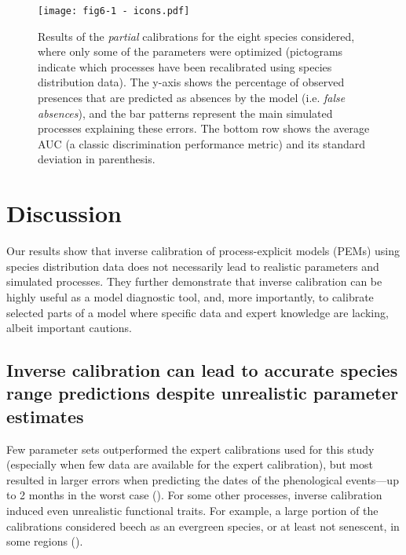 \documentclass[letterpaper,8pt]{extarticle}  %
\begin{document}
\begin{doublespacing}
\begin{linenumbers}
\begin{figure}[htpb]
\hspace*{-0.5cm}
\centering
\texttt{[image: fig6-1 - icons.pdf]}
\caption{Results of the \emph{partial} calibrations for the eight species considered, where only some of the parameters were optimized (pictograms indicate which processes have been recalibrated using species distribution data). The y-axis shows the percentage of observed presences that are predicted as absences by the model (i.e. \emph{false absences}), and the bar patterns represent the main simulated processes explaining these errors. The bottom row shows the average AUC (a classic discrimination performance metric) and its standard deviation in parenthesis.}
\label{fig:4}
\end{figure}


\section{Discussion}

Our results show that inverse calibration of process-explicit models (PEMs) using species distribution data does not necessarily lead to realistic parameters and simulated processes. They further demonstrate that inverse calibration can be highly useful as a model diagnostic tool, and, more importantly, to calibrate selected parts of a model where specific data and expert knowledge are lacking, albeit important cautions.

\subsection{Inverse calibration can lead to accurate species range predictions despite unrealistic parameter estimates}

Few parameter sets outperformed the expert calibrations used for this study (especially when few data are available for the expert calibration), but most resulted in larger errors when predicting the dates of the phenological events---up to 2 months in the worst case ().
For some other processes, inverse calibration induced even unrealistic functional traits. For example, a large portion of the calibrations considered beech as an evergreen species, or at least not senescent, in some regions ().


\end{linenumbers}
\end{doublespacing}
\end{document}
